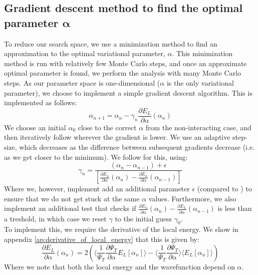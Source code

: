 \documentclass[a4paper, 10pt]{article}
\begin{document}
	\subsection{Gradient descent method to find the optimal parameter $\boldsymbol{\alpha}$}\label{sec:Gradient_descent_theory}
	To reduce our search space, we use a minimization method to find an approximation to the optimal variational parameter, $\alpha$. This minimization method is run with relatively few Monte Carlo steps, and once an approximate optimal parameter is found, we perform the analysis with many Monte Carlo steps. As our parameter space is one-dimensional ($\alpha$ is the only variational parameter), we choose to implement a simple gradient descent algorithm. This is implemented as follows:
	\begin{equation}
	\alpha_{n+1}=\alpha_n-\gamma_n \frac{\partial E_L}{\partial \alpha} (\alpha_n)
	\end{equation}
	We choose an initial $\alpha_0$ close to the correct $\alpha$ from the non-interacting case, and then iteratively follow wherever the gradient is lower. We use an adaptive step-size, which decreases as the difference between subsequent gradients decrease (i.e. as we get closer to the minimum). We follow \cite{doi:10.1093/imanum/8.1.141} for this, using:
	\begin{equation}
	\gamma_n=\frac{(\alpha_n-\alpha_{n-1})+\epsilon}{[\frac{\partial E_L}{\partial \alpha}(\alpha_n)-\frac{\partial E_L}{\partial \alpha}(\alpha_{n-1})]}
	\end{equation}
	Where we, however, implement add an additional parameter $\epsilon$ (compared to \cite{doi:10.1093/imanum/8.1.141}) to ensure that we do not get stuck at the same $\alpha$ values. Furthermore, we also implement an additional test that checks if $\frac{\partial E_L}{\partial \alpha}(\alpha_n)-\frac{\partial E_L}{\partial \alpha}(\alpha_{n-1})$ is less than a treshold, in which case we reset $\gamma$ to the initial guess $\gamma_0$.\\
	\linebreak	
	To implement this, we require the derivative of the local energy. We show in appendix \ref{ap:derivative_of_local_energy} that this is given by:
	\begin{equation}
	\frac{\partial E_L}{\partial \alpha}(\alpha_n)=2\left(\big\langle \frac{1}{\Psi_T}\frac{\partial \Psi_T}{\partial \alpha}E_L[\alpha_n]\big\rangle-\big\langle \frac{1}{\Psi_T}\frac{\partial \Psi_T}{\partial \alpha}\big\rangle \big\langle E_L[\alpha_n]\big\rangle\right)
	\end{equation}
	Where we note that both the local energy and the wavefunction depend on $\alpha$.
\end{document}
